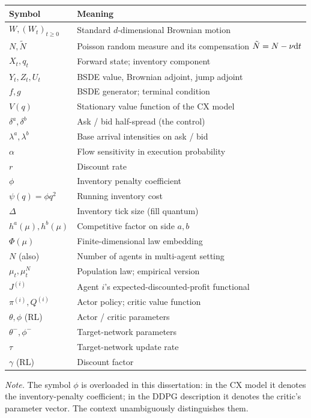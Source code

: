 \begin{tabular}{@{}ll@{}}
\toprule
Symbol & Meaning \\ \midrule
$W, (W_t)_{t \geq 0}$ & Standard $d$-dimensional Brownian motion \\
$N, \tilde N$ & Poisson random measure and its compensation $\tilde N = N - \nu \mathrm{d} t$ \\
$X_t, q_t$ & Forward state; inventory component \\
$Y_t, Z_t, U_t$ & BSDE value, Brownian adjoint, jump adjoint \\
$f, g$ & BSDE generator; terminal condition \\
$V(q)$ & Stationary value function of the CX model \\
$\delta^a, \delta^b$ & Ask / bid half-spread (the control) \\
$\lambda^a, \lambda^b$ & Base arrival intensities on ask / bid \\
$\alpha$ & Flow sensitivity in execution probability \\
$r$ & Discount rate \\
$\phi$ & Inventory penalty coefficient \\
$\psi(q) = \phi q^2$ & Running inventory cost \\
$\Delta$ & Inventory tick size (fill quantum) \\
$h^a(\mu), h^b(\mu)$ & Competitive factor on side $a, b$ \\
$\Phi(\mu)$ & Finite-dimensional law embedding \\
$N$ (also) & Number of agents in multi-agent setting \\
$\mu_t, \mu^N_t$ & Population law; empirical version \\
$J^{(i)}$ & Agent $i$'s expected-discounted-profit functional \\
$\pi^{(i)}, Q^{(i)}$ & Actor policy; critic value function \\
$\theta, \phi$ (RL) & Actor / critic parameters \\
$\theta^-, \phi^-$ & Target-network parameters \\
$\tau$ & Target-network update rate \\
$\gamma$ (RL) & Discount factor \\ \bottomrule
\end{tabular}

\bigskip

\noindent \emph{Note.} The symbol $\phi$ is overloaded in this dissertation: in the CX model it denotes the inventory-penalty coefficient; in the DDPG description it denotes the critic's parameter vector. The context unambiguously distinguishes them.

